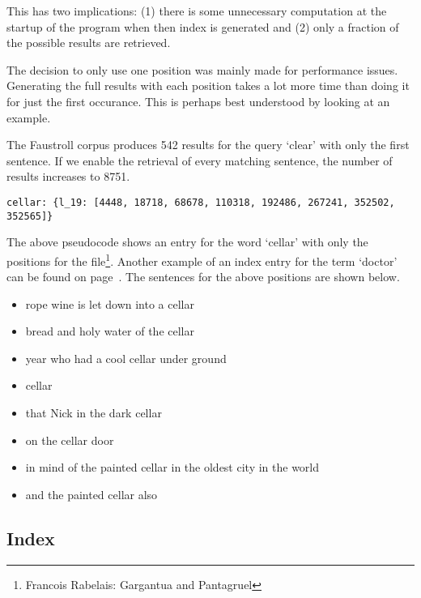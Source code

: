 This has two implications: (1) there is some unnecessary computation at the startup of the program when then index is generated and (2) only a fraction of the possible results are retrieved.

The decision to only use one position was mainly made for performance issues. Generating the full results with each position takes a lot more time than doing it for just the first occurance. This is perhaps best understood by looking at an example.

The Faustroll corpus produces \num{542} results for the query `clear' with only the first sentence. If we enable the retrieval of every matching sentence, the number of results increases to \num{8751}.

\begin{verbatim}
cellar: {l_19: [4448, 18718, 68678, 110318, 192486, 267241, 352502, 352565]}
\end{verbatim}

The above pseudocode shows an entry for the word `cellar' with only the positions for the  file\footnote{Francois Rabelais: Gargantua and Pantagruel}. Another example of an index entry for the term `doctor' can be found on page~\pageref{c:pos}. The sentences for the above positions are shown below.

\begin{itemize}
  \item rope wine is let down into a cellar
  \item bread and holy water of the cellar
  \item year who had a cool cellar under ground
  \item cellar
  \item that Nick in the dark cellar
  \item on the cellar door
  \item in mind of the painted cellar in the oldest city in the world
  \item and the painted cellar also
\end{itemize}






\subsection{Index}
\label{s:analindex}


